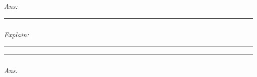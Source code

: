 \documentclass[
]{article}
\begin{document}
\emph{Ans: }

\begin{center}\rule{0.5\linewidth}{0.5pt}\end{center}

\hypertarget{section-14}{%
\subparagraph{}\label{section-14}}

\emph{Explain:}

\begin{center}\rule{0.5\linewidth}{0.5pt}\end{center}

\begin{center}\rule{0.5\linewidth}{0.5pt}\end{center}

\hypertarget{section-15}{%
\subparagraph{}\label{section-15}}

\emph{Ans. }
\end{document}
